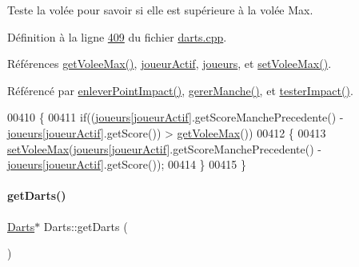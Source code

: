Teste la volée pour savoir si elle est supérieure à la volée Max. 



Définition à la ligne \hyperlink{darts_8cpp_source_l00409}{409} du fichier \hyperlink{darts_8cpp_source}{darts.\+cpp}.



Références \hyperlink{darts_8cpp_source_l00066}{get\+Volee\+Max()}, \hyperlink{darts_8h_source_l00076}{joueur\+Actif}, \hyperlink{darts_8h_source_l00073}{joueurs}, et \hyperlink{darts_8cpp_source_l00121}{set\+Volee\+Max()}.



Référencé par \hyperlink{darts_8cpp_source_l00274}{enlever\+Point\+Impact()}, \hyperlink{darts_8cpp_source_l00303}{gerer\+Manche()}, et \hyperlink{darts_8cpp_source_l00246}{tester\+Impact()}.


\begin{DoxyCode}
00410 \{
00411     \textcolor{keywordflow}{if}((\hyperlink{class_darts_a81bc116f3ae70cea1f492f87f01901c7}{joueurs}[\hyperlink{class_darts_a68fb01b9aad6502e4429dfbf2a72d50b}{joueurActif}].getScoreManchePrecedente() - 
      \hyperlink{class_darts_a81bc116f3ae70cea1f492f87f01901c7}{joueurs}[\hyperlink{class_darts_a68fb01b9aad6502e4429dfbf2a72d50b}{joueurActif}].getScore()) > \hyperlink{class_darts_af2ca14bafbcdabe87fc306cc2e1d390e}{getVoleeMax}())
00412     \{
00413         \hyperlink{class_darts_a982dda6ea65e4ada297cc562617fc3ba}{setVoleeMax}(\hyperlink{class_darts_a81bc116f3ae70cea1f492f87f01901c7}{joueurs}[\hyperlink{class_darts_a68fb01b9aad6502e4429dfbf2a72d50b}{joueurActif}].getScoreManchePrecedente() - 
      \hyperlink{class_darts_a81bc116f3ae70cea1f492f87f01901c7}{joueurs}[\hyperlink{class_darts_a68fb01b9aad6502e4429dfbf2a72d50b}{joueurActif}].getScore());
00414     \}
00415 \}
\end{DoxyCode}
\mbox{\label{class_darts_a6548d12f81017792cf46b25f68fc5df8}} 
\paragraph{\texorpdfstring{get\+Darts()}{getDarts()}}
{\footnotesize\ttfamily \hyperlink{class_darts}{Darts}$\ast$ Darts\+::get\+Darts (\begin{DoxyParamCaption}{ }\end{DoxyParamCaption})}

\mbox{\label{class_darts_a20ddfd28c8355c06a90cc23abff3de11}} 
